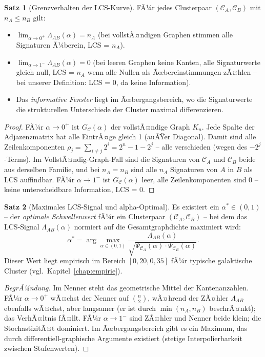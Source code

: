 ﻿\documentclass[a4paper,12pt]{report}
\theoremstyle{definition}
\newtheorem{satz}{Satz}
\begin{document}
\begin{satz}[Grenzverhalten der LCS-Kurve]
\label{satz:grenzverhalten}
FÃ¼r jedes Clusterpaar $(\mathcal{C}_A, \mathcal{C}_B)$ mit $n_A \leq n_B$ gilt:
\begin{itemize}
    \item $\lim_{\alpha \to 0^+} \Lambda_{AB}(\alpha) = n_A$ (bei vollstÃ¤ndigen Graphen stimmen alle Signaturen Ã¼berein, LCS = $n_A$).
    \item $\lim_{\alpha \to 1^-} \Lambda_{AB}(\alpha) = 0$ (bei leeren Graphen keine Kanten, alle Signaturwerte gleich null, LCS = $n_A$ wenn alle Nullen als Ãœbereinstimmungen zÃ¤hlen -- bei unserer Definition: LCS = 0, da keine Information).
    \item Das \emph{informative Fenster} liegt im Ãœbergangsbereich, wo die Signaturwerte die strukturellen Unterschiede der Cluster maximal differenzieren.
\end{itemize}
\end{satz}

\begin{proof}
FÃ¼r $\alpha \to 0^+$ ist $G_\mathcal{C}(\alpha)$ der vollstÃ¤ndige Graph $K_n$. Jede Spalte der Adjazenzmatrix hat alle EintrÃ¤ge gleich 1 (auÃŸer Diagonal). Damit sind alle Zeilenkomponenten $\rho_j = \sum_{i \neq j} 2^i = 2^n - 1 - 2^j$ -- alle verschieden (wegen des $-2^j$-Terms). Im VollstÃ¤ndig-Graph-Fall sind die Signaturen von $\mathcal{C}_A$ und $\mathcal{C}_B$ beide aus derselben Familie, und bei $n_A = n_B$ sind alle $n_A$ Signaturen von $A$ in $B$ als LCS auffindbar. FÃ¼r $\alpha \to 1^-$ ist $G_\mathcal{C}(\alpha)$ leer, alle Zeilenkomponenten sind 0 -- keine unterscheidbare Information, LCS = 0.
\end{proof}

\begin{satz}[Maximales LCS-Signal und alpha-Optimal]
\label{satz:alpha_opt}
Es existiert ein $\alpha^* \in (0,1)$ -- der \emph{optimale Schwellenwert} fÃ¼r ein Clusterpaar $(\mathcal{C}_A, \mathcal{C}_B)$ -- bei dem das LCS-Signal $\Lambda_{AB}(\alpha)$ normiert auf die Gesamtgraphdichte maximiert wird:
\[
\alpha^* = \arg\max_{\alpha \in (0,1)} \frac{\Lambda_{AB}(\alpha)}{\sqrt{\Psi_{\mathcal{C}_A}(\alpha) \cdot \Psi_{\mathcal{C}_B}(\alpha)}}.
\]
Dieser Wert liegt empirisch im Bereich $[0{,}20, 0{,}35]$ fÃ¼r typische galaktische Cluster (vgl.\ Kapitel~\ref{chap:empirie}).
\end{satz}

\begin{proof}[BegrÃ¼ndung]
Im Nenner steht das geometrische Mittel der Kantenanzahlen. FÃ¼r $\alpha \to 0^+$ wÃ¤chst der Nenner auf $\binom{n}{2}$, wÃ¤hrend der ZÃ¤hler $\Lambda_{AB}$ ebenfalls wÃ¤chst, aber langsamer (er ist durch $\min(n_A, n_B)$ beschrÃ¤nkt); das VerhÃ¤ltnis fÃ¤llt. FÃ¼r $\alpha \to 1^-$ sind ZÃ¤hler und Nenner beide klein; die StochastizitÃ¤t dominiert. Im Ãœbergangsbereich gibt es ein Maximum, das durch differentiell-graphische Argumente existiert (stetige Interpolierbarkeit zwischen Stufenwerten).
\end{proof}
\end{document}

